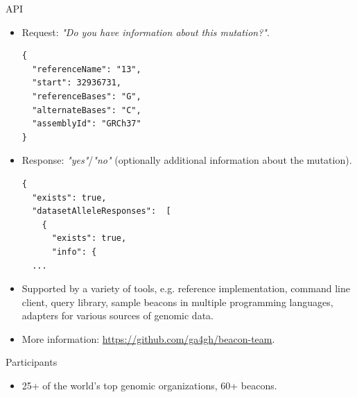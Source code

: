 \documentclass{beamer}
\begin{document}
\begin{frame}[fragile]
\begin{columns}[T]
\begin{column}{.48\textwidth}
\begin{block}{API\hfill{}}
\begin{itemize}
\item Request: \textit{"Do you have information about this mutation?"}.
\begin{lstlisting}[style=json]
{
  "referenceName": "13",
  "start": 32936731,
  "referenceBases": "G",
  "alternateBases": "C",
  "assemblyId": "GRCh37"
}
\end{lstlisting}
\item Response: \textit{"yes"}/\textit{"no"} (optionally additional information about the mutation).
\begin{lstlisting}[style=json]
{
  "exists": true,
  "datasetAlleleResponses":  [
    {
      "exists": true,
      "info": {
  ...
\end{lstlisting}
\item Supported by a variety of tools, e.g. reference implementation, command line client, query library, sample beacons in multiple programming languages, adapters for various sources of genomic data.
\item More information: \url{https://github.com/ga4gh/beacon-team}.
\end{itemize}
\end{block}

\begin{block}{Participants\hfill{}}
\begin{itemize}
\item 25+ of the world's top genomic organizations, 60+ beacons.


\end{itemize}
\end{block}
\end{column}
\end{columns}
\end{frame}
\end{document}
